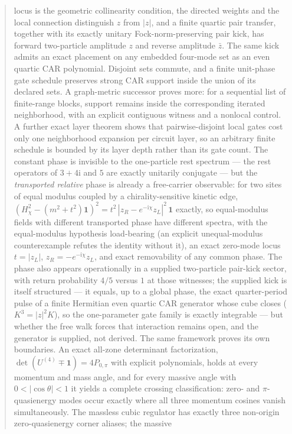 \documentclass[11pt]{article}
\newcommand{\ii}{\mathrm{i}}
\newcommand{\id}{\mathbf{1}}
\begin{document}
\begin{abstract}
locus is the geometric collinearity condition, the directed weights and the
local connection distinguish $z$ from $|z|$, and a finite quartic pair
transfer, together with its exactly unitary Fock-norm-preserving pair kick,
has forward two-particle amplitude $z$ and reverse amplitude $\bar z$.  The
same kick admits an exact placement on any embedded four-mode set as an even
quartic CAR polynomial.  Disjoint sets commute, and a finite unit-phase gate
schedule preserves strong CAR support inside the union of its declared sets.
A graph-metric successor proves more: for a sequential list of finite-range
blocks, support remains inside the corresponding iterated neighborhood, with
an explicit contiguous witness and a nonlocal control.  A further exact
layer theorem shows that pairwise-disjoint local gates cost only one
neighborhood expansion per circuit layer, so an arbitrary finite schedule is
bounded by its layer depth rather than its gate count.  The
constant phase is invisible to the one-particle rest spectrum --- the rest
operators of $3+4\ii$ and $5$ are exactly unitarily conjugate --- but the
\emph{transported relative} phase is already a free-carrier observable: for
two sites of equal modulus coupled by a chirality-sensitive kinetic edge,
$(H_\chi^2-(m^2+t^2)\id)^2=t^2\,|z_R-e^{-\ii\chi}z_L|^2\,\id$ exactly, so
equal-modulus fields with different transported phase have different
spectra, with the equal-modulus hypothesis load-bearing (an explicit
unequal-modulus counterexample refutes the identity without it), an exact
zero-mode locus $t=|z_L|$, $z_R=-e^{-\ii\chi}z_L$, and exact removability of
any common phase.  The phase also appears operationally in a supplied
two-particle pair-kick sector, with return probability $4/5$ versus $1$ at
those witnesses; the supplied kick is itself structured --- it equals, up
to a global phase, the exact quarter-period pulse of a finite Hermitian
even quartic CAR generator whose cube closes ($K^3=|z|^2K$), so the
one-parameter gate family is exactly integrable --- but whether the free
walk forces that interaction remains open, and the generator is supplied,
not derived.  The
same framework proves its own boundaries.  An exact all-zone determinant
factorization, $\det(U^{(4)}\mp\id)=4P_{0,\pi}$ with explicit polynomials,
holds at every momentum and mass angle, and for every massive angle with
$0<|\cos\theta|<1$ it yields a complete crossing classification: zero- and
$\pi$-quasienergy modes occur exactly where all three momentum cosines
vanish simultaneously.  The massless cubic regulator has
exactly three non-origin zero-quasienergy corner aliases; the massive

\end{abstract}
\end{document}

